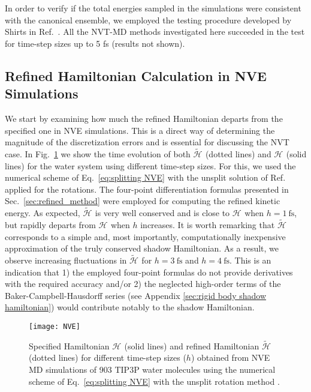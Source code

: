 \documentclass[
	aip,
	jcp,
	reprint,
]{revtex4-1}
\newcommand{\Ham}[1]{{\mathcal H}_\text{#1}}           %
\newcommand{\timestep}{h}
\newcommand{\refined}[1]{\widetilde{#1}}
\begin{document}
In order to verify if the total energies sampled in the simulations were consistent with the canonical ensemble, we employed the testing procedure developed by Shirts in Ref.~.
All the NVT-MD methods investigated here succeeded in the test for time-step sizes up to 5 fs (results not shown).

\subsection{Refined Hamiltonian Calculation in NVE Simulations}

We start by examining how much the refined Hamiltonian departs from the specified one in NVE simulations.
This is a direct way of determining the magnitude of the discretization errors \cite{Engle_2005} and is essential for discussing the NVT case.
In Fig.~\ref{fig:nve} we show the time evolution of both $\refined{\Ham{}}$ (dotted lines) and $\Ham{}$ (solid lines) for the water system using different time-step sizes.
For this, we used the numerical scheme of Eq.~\eqref{eq:splitting NVE} with the unsplit solution of Ref.~ applied for the rotations.
The four-point differentiation formulas presented in Sec.~\ref{sec:refined_method} were employed for computing the refined kinetic energy.
As expected, $\refined{\Ham{}}$ is very well conserved and is close to $\Ham{}$ when $\timestep = 1~\text{fs}$, but rapidly departs from $\Ham{}$ when $\timestep$ increases.
It is worth remarking that $\refined{\Ham{}}$ corresponds to a simple and, most importantly, computationally inexpensive approximation of the truly conserved shadow Hamiltonian.
As a result, we observe increasing fluctuations in $\refined{\Ham{}}$ for $\timestep = 3~\text{fs}$ and $\timestep = 4~\text{fs}$.
This is an indication that
1) the employed four-point formulas do not provide derivatives with the required accuracy and/or
2) the neglected high-order terms of the Baker-Campbell-Hausdorff series (see Appendix \ref{sec:rigid body shadow hamiltonian}) would contribute notably to the shadow Hamiltonian.

\begin{figure}
	\texttt{[image: NVE]}
	\caption{Specified Hamiltonian $\Ham{}$ (solid lines) and refined Hamiltonian $\refined{\Ham{}}$ (dotted lines) for different time-step sizes ($\timestep$) obtained from NVE MD simulations of 903 TIP3P \cite{Jorgensen_1983} water molecules using the numerical scheme of Eq.~\eqref{eq:splitting NVE} with the unsplit rotation method \cite{Silveira_2017}.}
	\label{fig:nve}
\end{figure}
\end{document}
